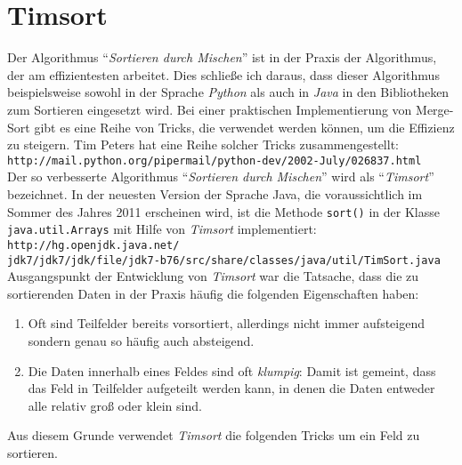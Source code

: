 
\section{Timsort}
Der Algorithmus ``\emph{Sortieren durch Mischen}'' ist in der Praxis der Algorithmus, der
am effizientesten arbeitet.  Dies schlie{\ss}e ich daraus, dass dieser Algorithmus
beispielsweise sowohl in der Sprache \textsl{Python} als auch in \textsl{Java} in den
Bibliotheken zum Sortieren eingesetzt wird.
Bei einer praktischen Implementierung von Merge-Sort gibt es eine Reihe von Tricks, die
verwendet werden k\"onnen, um die Effizienz zu steigern.  Tim Peters hat eine Reihe solcher
Tricks zusammengestellt:
\\[0.2cm]
\hspace*{1.3cm}
\texttt{http://mail.python.org/pipermail/python-dev/2002-July/026837.html}
\\[0.2cm]
Der so verbesserte  Algorithmus ``\emph{Sortieren durch Mischen}'' wird als ``\emph{Timsort}''
bezeichnet.  In der neuesten Version der Sprache Java, die voraussichtlich im Sommer des Jahres 2011
erscheinen wird, ist die Methode \texttt{sort()} in der Klasse \texttt{java.util.Arrays}
mit Hilfe von \emph{Timsort} implementiert:
\\[0.2cm]
\hspace*{1.3cm}
\texttt{http://hg.openjdk.java.net/}
\\
\hspace*{2.0cm}
\texttt{jdk7/jdk7/jdk/file/jdk7-b76/src/share/classes/java/util/TimSort.java}
\\[0.2cm]
Ausgangspunkt der Entwicklung von \emph{Timsort} war die Tatsache, dass die zu
sortierenden Daten in der Praxis h\"aufig die folgenden Eigenschaften haben:
\begin{enumerate}
\item Oft sind Teilfelder bereits vorsortiert, allerdings nicht immer aufsteigend sondern genau so
      h\"aufig auch absteigend.
\item Die Daten innerhalb eines Feldes sind oft \emph{klumpig}: Damit ist gemeint, dass das Feld
      in Teilfelder aufgeteilt werden kann, in denen die Daten entweder alle relativ gro{\ss} oder klein
      sind.
\end{enumerate}
Aus diesem Grunde verwendet \emph{Timsort} die folgenden Tricks um ein Feld zu sortieren.
